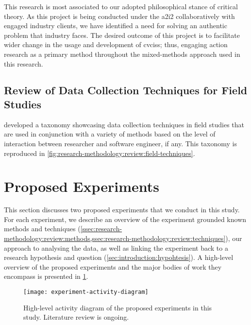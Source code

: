 This research is most associated to our adopted philosophical stance of critical theory. As this project is being conducted under the \gls{a2i2} collaboratively with engaged industry clients, we have identified a need for solving an authentic problem that industry faces. The desired outcome of this project is to facilitate wider change in the usage and development of \glspl{cvcis}; thus, engaging action research as a primary method throughout the mixed-methods approach used in this research.

\subsection{Review of Data Collection Techniques for Field Studies}
\label{ssec:research-methodology:review:techniques}

\citeauthor{Singer:2007tu} developed a taxonomy \citep{Singer:2007tu,Lethbridge:2005jv} showcasing data collection techniques in field studies that are used in conjunction with a variety of methods based on the level of interaction between researcher and software engineer, if any. This taxonomy is reproduced in \cref{fig:research-methodology:review:field-techniques}.

\section{Proposed Experiments}
\label{sec:research-methodology:experiments}

This section discusses two proposed experiments that we conduct in this study. For each experiment, we describe an overview of the experiment grounded known methods and techniques (\cref{ssec:research-methodology:review:methods,ssec:research-methodology:review:techniques}), our approach to analysing the data, as well as linking the experiment back to a research hypothesis and question (\cref{sec:introduction:hypohtesis}). A high-level overview of the proposed experiments and the major bodies of work they encompass is presented in \cref{fig:research-methodology:review:activity-diagram}.

\begin{figure}[t!]
  \centering
  \texttt{[image: experiment-activity-diagram]}
  \caption[High-level overview of the proposed experiments]{High-level activity diagram of the proposed experiments in this study. Literature review is ongoing.}
  \label{fig:research-methodology:review:activity-diagram}
\end{figure}


